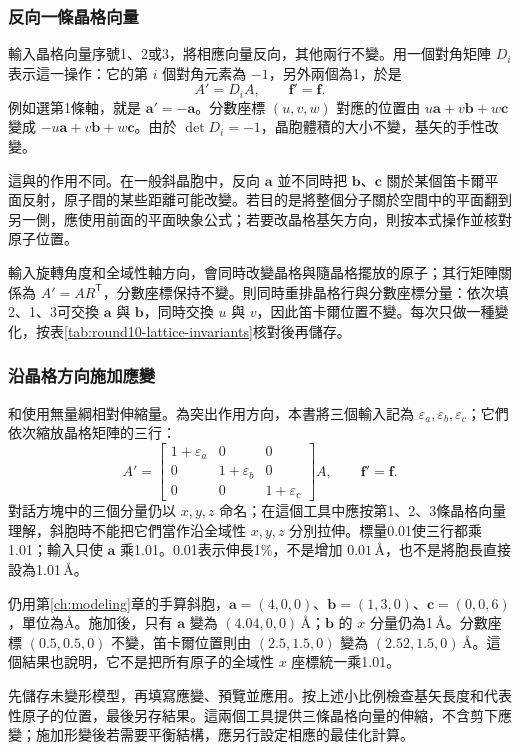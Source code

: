 \subsubsection{反向一條晶格向量}

輸入晶格向量序號1、2或3，將相應向量反向，其他兩行不變。用一個對角矩陣 $D_i$ 表示這一操作：它的第 $i$ 個對角元素為 $-1$，另外兩個為1，於是
\begin{equation}
 A'=D_iA,\qquad \mathbf f'=\mathbf f.
 \label{eq:mirror-lattice-row}
\end{equation}
例如選第1條軸，就是 $\mathbf a'=-\mathbf a$。分數座標 $(u,v,w)$ 對應的位置由 $u\mathbf a+v\mathbf b+w\mathbf c$ 變成 $-u\mathbf a+v\mathbf b+w\mathbf c$。由於 $\det D_i=-1$，晶胞體積的大小不變，基矢的手性改變。

這與的作用不同。在一般斜晶胞中，反向 $\mathbf a$ 並不同時把 $\mathbf b$、$\mathbf c$ 關於某個笛卡爾平面反射，原子間的某些距離可能改變。若目的是將整個分子關於空間中的平面翻到另一側，應使用前面的平面映象公式；若要改晶格基矢方向，則按本式操作並核對原子位置。

輸入旋轉角度和全域性軸方向，會同時改變晶格與隨晶格擺放的原子；其行矩陣關係為 $A'=AR^{\mathsf T}$，分數座標保持不變。則同時重排晶格行與分數座標分量：依次填2、1、3可交換 $\mathbf a$ 與 $\mathbf b$，同時交換 $u$ 與 $v$，因此笛卡爾位置不變。每次只做一種變化，按表\ref{tab:round10-lattice-invariants}核對後再儲存。

\subsubsection{沿晶格方向施加應變}

和使用無量綱相對伸縮量。為突出作用方向，本書將三個輸入記為 $\varepsilon_a,\varepsilon_b,\varepsilon_c$；它們依次縮放晶格矩陣的三行：
\begin{equation}
 A'=\begin{bmatrix}
 1+\varepsilon_a&0&0\\
 0&1+\varepsilon_b&0\\
 0&0&1+\varepsilon_c
 \end{bmatrix}A,\qquad \mathbf f'=\mathbf f.
 \label{eq:lattice-axial-strain}
\end{equation}
對話方塊中的三個分量仍以 $x,y,z$ 命名；在這個工具中應按第1、2、3條晶格向量理解，斜胞時不能把它們當作沿全域性 $x,y,z$ 分別拉伸。標量0.01使三行都乘1.01；輸入只使 $\mathbf a$ 乘1.01。0.01表示伸長1\%，不是增加 $0.01\,\text{\AA}$，也不是將胞長直接設為1.01\,\AA。

仍用第\ref{ch:modeling}章的手算斜胞，$\mathbf a=(4,0,0)$、$\mathbf b=(1,3,0)$、$\mathbf c=(0,0,6)$，單位為\AA。施加後，只有 $\mathbf a$ 變為 $(4.04,0,0)\,\text{\AA}$；$\mathbf b$ 的 $x$ 分量仍為1\,\AA。分數座標 $(0.5,0.5,0)$ 不變，笛卡爾位置則由 $(2.5,1.5,0)$ 變為 $(2.52,1.5,0)\,\text{\AA}$。這個結果也說明，它不是把所有原子的全域性 $x$ 座標統一乘1.01。

先儲存未變形模型，再填寫應變、預覽並應用。按上述小比例檢查基矢長度和代表性原子的位置，最後另存結果。這兩個工具提供三條晶格向量的伸縮，不含剪下應變；施加形變後若需要平衡結構，應另行設定相應的最佳化計算。
